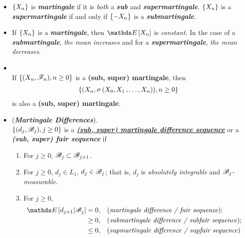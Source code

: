 \documentclass[11pt]{article}
\begin{document}
\begin{itemize}
\item \begin{remark}
$\left\{X_n\right\}$ is \emph{\textbf{martingale}} if it is \emph{both} a \emph{\textbf{sub}} and \emph{\textbf{supermartingale}}. $\left\{X_n\right\}$ is a \emph{\textbf{supermartingale}} if and only if $\left\{-X_n\right\}$ is a \emph{\textbf{submartingale}}.
\end{remark}

\item \begin{remark}
If $\left\{X_n\right\}$ is a \emph{\textbf{martingale}}, then $\E{}{X_n}$ is \emph{constant}. In the case of a \emph{\textbf{submartingale}}, \emph{the mean increases} and for a \emph{\textbf{supermartingale}}, \emph{the mean decreases}.
\end{remark}

\item \begin{proposition} \citep{resnick2013probability}\\
If  $\left\{ (X_n, {\mathscr F}_n),  n \ge 0\right\}$ is a \textbf{(sub, super) martingale}, then 
\begin{align*}
\left\{ (X_n, \sigma\left(X_0, X_1 \,{,}\ldots{,}\, X_n\right)),  n \ge 0\right\}
\end{align*} is also a \textbf{(sub, super) martingale}.
\end{proposition}

\item \begin{definition} (\textbf{\emph{Martingale Differences}}).  \citep{resnick2013probability}\\
$\left\{(d_j, {\mathscr B}_j), j \ge 0\right\}$ is a \underline{\emph{\textbf{(sub, super) martingale difference sequence}}} or a \textit{\textbf{(sub, super) fair sequence}} if
\begin{enumerate}
\item For $j \ge 0$,  ${\mathscr B}_j \subset {\mathscr B}_{j+1}$.
\item For $j \ge 0$,  $d_j \in L_1$,  $d_j \in {\mathscr B}_j$; that is, $d_j$ is \emph{absolutely integrable} and \emph{${\mathscr B}_j$-measurable}.
\item For $j \ge 0$,
\begin{align*}
\E{}{d_{j+1} | \srB_j} &= 0, && \text{(\emph{martingale difference / fair sequence})};\\
& \ge 0, && \text{(\emph{submartingale difference / subfair sequence})};\\
& \le 0, && \text{(\emph{supmartingale difference / supfair sequence})}
\end{align*}
\end{enumerate}
\end{definition}


\end{itemize}
\end{document}
